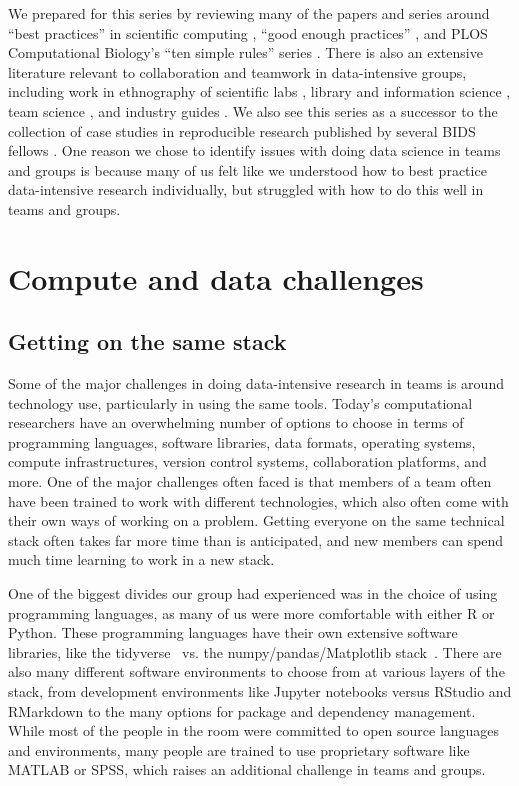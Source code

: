 \documentclass[11pt]{elife}
\begin{document}
We prepared for this series by reviewing many of the papers and series around ``best practices'' in scientific computing  \citep[e.g.][]{Wilson2014,Noble2009}, ``good enough practices'' \citep{Wilson2017}, and PLOS Computational Biology’s ``ten simple rules'' series \citep[e.g.][]{Sandve2013,Goodman2014,PerezRiverol2016}. There is also an extensive literature relevant to collaboration and teamwork in data-intensive groups, including work in ethnography of scientific labs \citep[e.g.][]{traweek1992}, library and information science \citep[e.g.][]{borgman2015}, team science \citep[e.g.][]{NAP19007}, and industry guides \citep[e.g.][]{patil2011building}. We also see this series as a successor to the collection of case studies in reproducible research published by several BIDS fellows \citep{Kitzes2018}. One reason we chose to identify issues with doing data science in teams and groups is because many of us felt like we understood how to best practice data-intensive research individually, but struggled with how to do this well in teams and groups.

\section{Compute and data challenges}

\subsection{Getting on the same stack}

Some of the major challenges in doing data-intensive research in teams is around technology use, particularly in using the same tools. Today’s computational researchers have an overwhelming number of options to choose in terms of programming languages, software libraries, data formats, operating systems, compute infrastructures, version control systems, collaboration platforms, and more. One of the major challenges often faced is that members of a team often have been trained to work with different technologies, which also often come with their own ways of working on a problem. Getting everyone on the same technical stack often takes far more time than is anticipated, and new members can spend much time learning to work in a new stack.


One of the biggest divides our group had experienced was in the choice of using programming languages, as many of us were more comfortable with either R or Python. These programming languages have their own extensive software libraries, like the tidyverse~\citep{wickham2017tidyverse} vs. the numpy/pandas/Matplotlib stack~\citep{vanderwalt2011,Hunter2007}. There are also many different software environments to choose from at various layers of the stack, from development environments like Jupyter notebooks versus RStudio and RMarkdown to the many options for package and dependency management. While most of the people in the room were committed to open source languages and environments, many people are trained to use proprietary software like MATLAB or SPSS, which raises an additional challenge in teams and groups.
\end{document}
